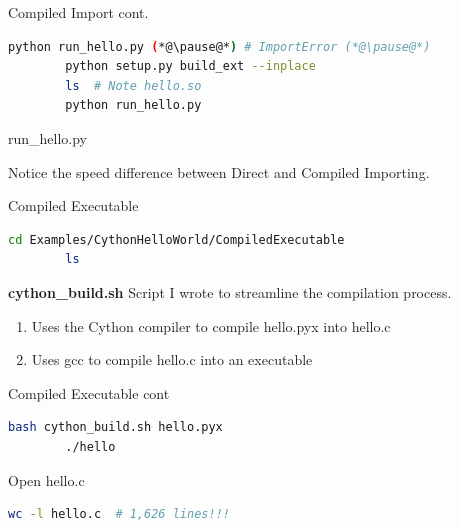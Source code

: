 \documentclass[11pt]{beamer}
\begin{document}
\begin{frame}[fragile]{Compiled Import cont.}
	\begin{lstlisting}[language=Bash]
		python run_hello.py (*@\pause@*) # ImportError (*@\pause@*)
		python setup.py build_ext --inplace
		ls  # Note hello.so
		python run_hello.py
	\end{lstlisting}
	
	run\_hello.py
	

	\pause
	Notice the speed difference between Direct and Compiled Importing.
\end{frame}

\begin{frame}[fragile]{Compiled Executable}
	\begin{lstlisting}[language=Bash]
		cd Examples/CythonHelloWorld/CompiledExecutable
		ls	
	\end{lstlisting}
	
	\begin{flushleft}
		\textbf{cython\_build.sh} Script I wrote to streamline the compilation process. 
		\begin{enumerate}
			\item Uses the Cython compiler to compile hello.pyx into hello.c
			\item Uses gcc to compile hello.c into an executable
		\end{enumerate}
	\end{flushleft}
\end{frame}

\begin{frame}[fragile]{Compiled Executable cont}
	\begin{lstlisting}[language=Bash]
		bash cython_build.sh hello.pyx
		./hello
	\end{lstlisting}
	
	\pause
	Open hello.c
	\pause
	\begin{lstlisting}[language=Bash]
		wc -l hello.c  # 1,626 lines!!!
	\end{lstlisting}
\end{frame}
\end{document}
